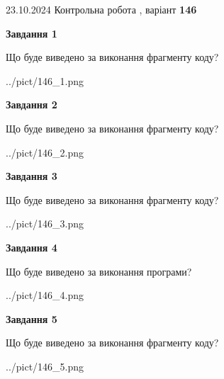 \documentclass[12pt, ukrainian]{article}
\begin{document}
{\Large{23.10.2024 Контрольна робота , варіант  \No \textbf { 146 }\par}}
{
\begin {large}
{\begin {center}\textbf{Завдання 1}\end {center}}

Що буде виведено за виконання фрагменту коду?\par
\begin{center}
	{../pict/146_1.png}
\end{center}
\newpage

{\begin {center}\textbf{Завдання 2}\end {center}}

Що буде виведено за виконання фрагменту коду?\par
\begin{center}
	{../pict/146_2.png}
\end{center}
\newpage

{\begin {center}\textbf{Завдання 3}\end {center}}

Що буде виведено за виконання фрагменту коду?\par
\begin{center}
	{../pict/146_3.png}
\end{center}
\newpage

{\begin {center}\textbf{Завдання 4}\end {center}}

Що буде виведено за виконання програми?\par
\begin{center}
	{../pict/146_4.png}
\end{center}
\newpage

{\begin {center}\textbf{Завдання 5}\end {center}}

Що буде виведено за виконання фрагменту коду?\par
\begin{center}
	{../pict/146_5.png}
\end{center}
\newpage


\end{large}}
\end{document}
